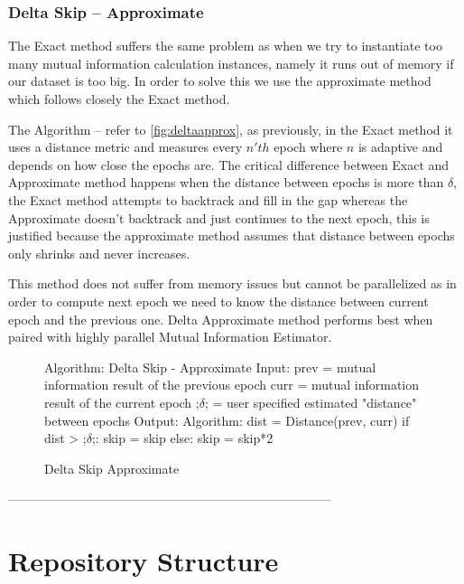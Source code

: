 \documentclass[dissertation.tex]{subfiles}
\begin{document}
\subsubsection{Delta Skip -- Approximate}

  The Exact method suffers the same problem as when we try to instantiate too
  many mutual information calculation instances, namely it runs out of memory if
  our dataset is too big. In order to solve this we use the approximate method
  which follows closely the Exact method. 

  The Algorithm -- refer to \autoref{fig:deltaapprox}, as previously, in the
  Exact method it uses a distance metric and measures every $n'th$ epoch where
  $n$ is adaptive and depends on how close the epochs are. The critical
  difference between Exact and Approximate method happens when the distance
  between epochs is more than $\delta$, the Exact method attempts to backtrack
  and fill in the gap whereas the Approximate doesn't backtrack and just
  continues to the next epoch, this is justified because the approximate method
  assumes that distance between epochs only shrinks and never increases.

  This method does not suffer from memory issues but cannot be parallelized as
  in order to compute next epoch we need to know the distance between current
  epoch and the previous one. Delta Approximate method performs best when paired
  with highly parallel Mutual Information Estimator.

\begin{figure}[H]
    \begin{pythonfigure}
      Algorithm: Delta Skip - Approximate
      Input:
      prev = mutual information result of the previous epoch
      curr = mutual information result of the current epoch
      ;$\delta$; = user specified estimated "distance" between epochs
      Output:
      Algorithm:
      dist = Distance(prev, curr)
      if dist > ;$\delta$;:
        skip = skip
      else:
        skip = skip*2
    \end{pythonfigure}
    \caption{Delta Skip Approximate}
    \label{fig:deltaapprox}
\end{figure}

-----------------------------------------------------------------------------

\section{Repository Structure}
\end{document}
